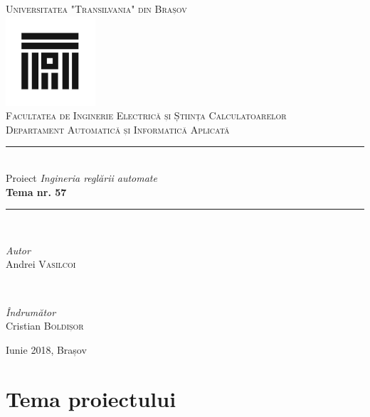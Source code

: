 \documentclass{article}
\author{Andrei Vasilcoi}
\begin{document}
\begin{titlepage}

\newcommand{\HRule}{\rule{\linewidth}{0.5mm}}
	
\begin{center}
\textsc{\LARGE Universitatea "Transilvania" din Brașov}\\[0.5cm]
\includegraphics[width=0.25\textwidth]{logo_ut.jpg}\\[0.5cm]
\textsc{\Large Facultatea de Inginerie Electrică și Știința Calculatoarelor}\\[0.5cm]
\textsc{\large Departament Automatică și Informatică Aplicată}\\[1.5cm]
\HRule\\[0.5cm]
{\Large Proiect \textit{Ingineria reglării automate}}\\[0.5cm]
{\LARGE\bfseries Tema nr. 57}\\[0.5cm]
\HRule\\[1.5cm]
	
\begin{minipage}{0.4\textwidth}
	\begin{flushleft}
		\large
		\textit{Autor}\\
		Andrei \textsc{Vasilcoi}\\
	\end{flushleft}
\end{minipage}
~
\begin{minipage}{0.4\textwidth}
	\begin{flushright}
		\large
		\textit{Îndrumător}\\
		Cristian \textsc{Boldișor}
	\end{flushright}
\end{minipage}
\vfill
{\large Iunie 2018, Brașov}\\[1cm]
\end{center}
\end{titlepage}

\newpage
{}
\tableofcontents

\newpage	
\section{Tema proiectului}
\end{document}
